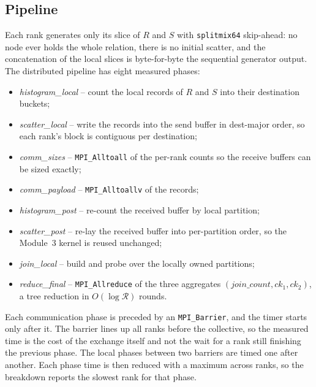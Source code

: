 \documentclass[10pt,twocolumn,a4paper]{article}
\begin{document}
\subsection{Pipeline}
Each rank generates only its slice of $R$ and $S$ with
\texttt{splitmix64} skip-ahead: no node ever holds the whole relation,
there is no initial scatter, and the concatenation of the local slices
is byte-for-byte the sequential generator output. The distributed
pipeline has eight measured phases:

\begin{itemize}\itemsep2pt
  \item \emph{histogram\_local} -- count the local records of $R$ and
    $S$ into their destination buckets;
  \item \emph{scatter\_local} -- write the records into the send buffer
    in dest-major order, so each rank's block is contiguous per
    destination;
  \item \emph{comm\_sizes} -- \texttt{MPI\_Alltoall} of the per-rank
    counts so the receive buffers can be sized exactly;
  \item \emph{comm\_payload} -- \texttt{MPI\_Alltoallv} of the records;
  \item \emph{histogram\_post} -- re-count the received buffer by local
    partition;
  \item \emph{scatter\_post} -- re-lay the received buffer into
    per-partition order, so the Module~3 kernel is reused
    unchanged;
  \item \emph{join\_local} -- build and probe over the locally owned
    partitions;
  \item \emph{reduce\_final} -- \texttt{MPI\_Allreduce} of the three
    aggregates $(\textit{join\_count},\textit{ck}_1,\textit{ck}_2)$, a
    tree reduction in $O(\log \mathcal{R})$ rounds.
\end{itemize}

\noindent Each communication phase is preceded by an
\texttt{MPI\_Barrier}, and the timer starts only after it. The barrier
lines up all ranks before the collective, so the measured time is the
cost of the exchange itself and not the wait for a rank still finishing
the previous phase. The local phases between two barriers are timed one
after another. Each phase time is then reduced with a maximum across
ranks, so the breakdown reports the slowest rank for that phase.
\end{document}
